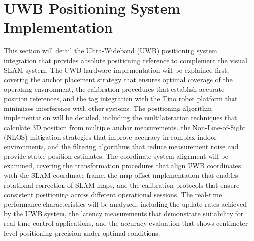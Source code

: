 \section{UWB Positioning System Implementation}
This section will detail the Ultra-Wideband (UWB) positioning system integration that provides absolute positioning reference to complement the visual SLAM system. The UWB hardware implementation will be explained first, covering the anchor placement strategy that ensures optimal coverage of the operating environment, the calibration procedures that establish accurate position references, and the tag integration with the Tino robot platform that minimizes interference with other systems. The positioning algorithm implementation will be detailed, including the multilateration techniques that calculate 3D position from multiple anchor measurements, the Non-Line-of-Sight (NLOS) mitigation strategies that improve accuracy in complex indoor environments, and the filtering algorithms that reduce measurement noise and provide stable position estimates. The coordinate system alignment will be examined, covering the transformation procedures that align UWB coordinates with the SLAM coordinate frame, the map offset implementation that enables rotational correction of SLAM maps, and the calibration protocols that ensure consistent positioning across different operational sessions. The real-time performance characteristics will be analyzed, including the update rates achieved by the UWB system, the latency measurements that demonstrate suitability for real-time control applications, and the accuracy evaluation that shows centimeter-level positioning precision under optimal conditions.

